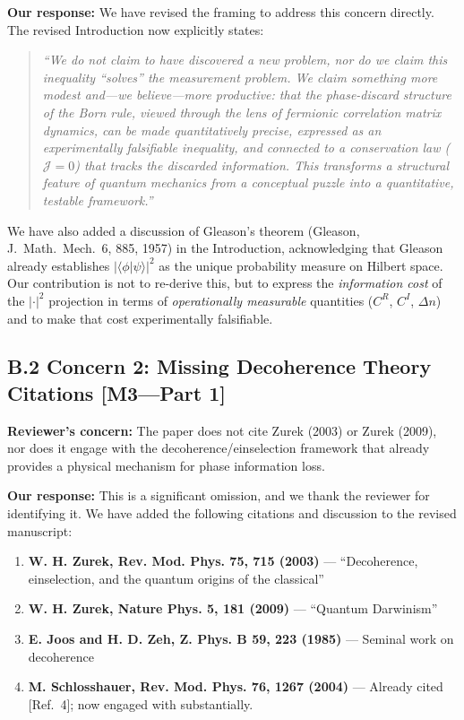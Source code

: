 \documentclass[11pt,a4paper]{article}
\begin{document}
\textbf{Our response:} We have revised the framing to address this concern directly. The revised Introduction now explicitly states:

\begin{quote}
\emph{``We do not claim to have discovered a new problem, nor do we claim this inequality ``solves'' the measurement problem. We claim something more modest and---we believe---more productive: that the phase-discard structure of the Born rule, viewed through the lens of fermionic correlation matrix dynamics, can be made quantitatively precise, expressed as an experimentally falsifiable inequality, and connected to a conservation law ($\mathcal{J}=0$) that tracks the discarded information. This transforms a structural feature of quantum mechanics from a conceptual puzzle into a quantitative, testable framework.''}
\end{quote}

We have also added a discussion of Gleason's theorem (Gleason, J.\ Math.\ Mech.\ 6, 885, 1957) in the Introduction, acknowledging that Gleason already establishes $|\langle \phi | \psi \rangle|^2$ as the unique probability measure on Hilbert space. Our contribution is not to re-derive this, but to express the \emph{information cost} of the $|\cdot|^2$ projection in terms of \emph{operationally measurable} quantities ($C^R$, $C^I$, $\Delta n$) and to make that cost experimentally falsifiable.

\subsection*{B.2 Concern 2: Missing Decoherence Theory Citations [M3---Part 1]}

\textbf{Reviewer's concern:} The paper does not cite Zurek (2003) or Zurek (2009), nor does it engage with the decoherence/einselection framework that already provides a physical mechanism for phase information loss.

\textbf{Our response:} This is a significant omission, and we thank the reviewer for identifying it. We have added the following citations and discussion to the revised manuscript:

\begin{enumerate}[leftmargin=*]
\item \textbf{W. H. Zurek, Rev. Mod. Phys. 75, 715 (2003)} --- ``Decoherence, einselection, and the quantum origins of the classical''
\item \textbf{W. H. Zurek, Nature Phys. 5, 181 (2009)} --- ``Quantum Darwinism''
\item \textbf{E. Joos and H. D. Zeh, Z. Phys. B 59, 223 (1985)} --- Seminal work on decoherence
\item \textbf{M. Schlosshauer, Rev. Mod. Phys. 76, 1267 (2004)} --- Already cited [Ref.~4]; now engaged with substantially.
\end{enumerate}
\end{document}
